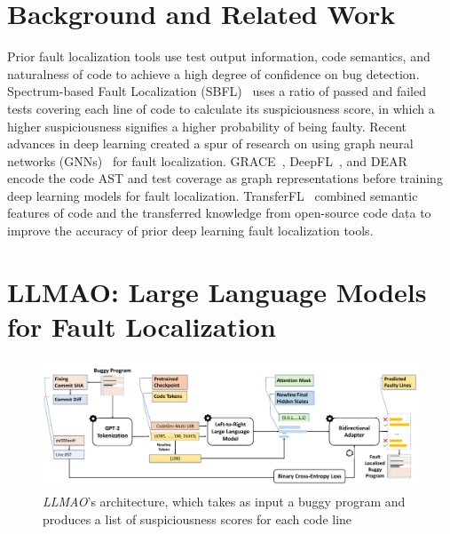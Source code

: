 \documentclass[12pt,openany,oneside,table]{cmuthesis}
\begin{document}
\section{Background and Related Work}

Prior fault localization tools use test output information, code semantics, and naturalness of code to achieve a high degree of confidence on bug detection. Spectrum-based Fault Localization (SBFL)~\cite{abreu2006evaluation, abreu2007accuracy} uses a ratio of passed and failed tests covering each line of code to calculate its suspiciousness score, in which a higher suspiciousness signifies a higher probability of being faulty. Recent advances in deep learning created a spur of research on using graph neural networks (GNNs)~\cite{GNN} for fault localization. GRACE~\cite{Grace}, DeepFL~\cite{DeepFL}, and DEAR~\cite{Dear} encode the code AST and test coverage as graph representations before training deep learning models for fault localization. TransferFL~\cite{TransferFL} combined semantic features of code and the transferred knowledge from open-source code data to improve the accuracy of prior deep learning fault localization tools.

\section{LLMAO: Large Language Models for Fault Localization}
\label{sec:LLMAO}

\begin{figure}
\centering
\includegraphics[width=\textwidth]{figures/approach/overview.pdf}
\caption{\small \textit{LLMAO}’s architecture, which takes as input a buggy program and produces a list of suspiciousness scores for each code line}
\label{fig:overview-llmao}
\end{figure}
\end{document}
